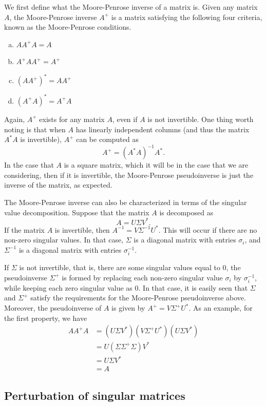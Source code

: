 \documentclass{article}
\begin{document}
We first define what the Moore-Penrose inverse of a matrix is. Given any matrix $A$, the Moore-Penrose inverse $A^+$ is a matrix satisfying the following four criteria, known as the Moore-Penrose conditions.

\begin{enumerate}[(a)]
    \item $AA^+A=A$
    \item $A^+AA^+=A^+$
    \item $(AA^+)^*=AA^+$
    \item $(A^+A)^*=A^+A$
\end{enumerate}

Again, $A^+$ exists for any matrix $A$, even if $A$ is not invertible. One thing worth noting is that when $A$ has linearly independent columns (and thus the matrix $A^*A$ is invertible), $A^+$ can be computed as
\[
    A^+=(A^*A)^{-1}A^*.
\]
In the case that $A$ is a square matrix, which it will be in the case that we are considering, then if it is invertible, the Moore-Penrose pseudoinverse is just the inverse of the matrix, as expected.

The Moore-Penrose inverse can also be characterized in terms of the singular value decomposition. Suppose that the matrix $A$ is decomposed as
\[
    A=U\Sigma V^*.
\]
If the matrix $A$ is invertible, then $A^{-1}=V\Sigma^{-1}U^*$. This will occur if there are no non-zero singular values. In that case, $\Sigma$ is a diagonal matrix with entries $\sigma_i$, and $\Sigma^{-1}$ is a diagonal matrix with entries $\sigma_i^{-1}$.

If $\Sigma$ is not invertible, that is, there are some singular values equal to $0$, the pseudoinverse $\Sigma^+$ is formed by replacing each non-zero singular value $\sigma_i$ by $\sigma_i^{-1}$, while keeping each zero singular value as $0$. In that case, it is easily seen that $\Sigma$ and $\Sigma^+$ satisfy the requirements for the Moore-Penrose pseudoinverse above. Moreover, the pseudoinverse of $A$ is given by $A^+=V\Sigma^+U^*$. As an example, for the first property, we have
\begin{align*}
    AA^+A&=(U\Sigma V^*)(V\Sigma^+ U^*)(U\Sigma V^*)\\
    &=U(\Sigma\Sigma^+\Sigma)V^*\\
    &=U\Sigma V^*\\
    &=A
\end{align*}

\subsection{Perturbation of singular matrices}
\end{document}
